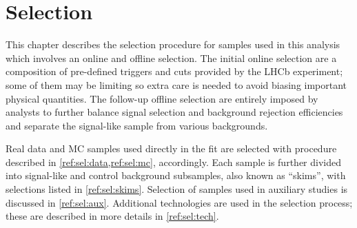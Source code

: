 \chapter{Selection}
\label{ref:sel}

This chapter describes the selection procedure for samples used in this
analysis which involves an online and offline selection.
The initial online selection are a composition of
pre-defined triggers and cuts provided by the LHCb experiment;
some of them may be limiting so extra care is needed to avoid biasing important
physical quantities.
The follow-up offline selection are entirely imposed by analysts
to further balance signal selection and background rejection efficiencies
and separate the signal-like sample from various backgrounds.

Real data and MC samples used directly in the fit are selected with procedure
described in \cref{ref:sel:data,ref:sel:mc}, accordingly.
Each sample is further divided into signal-like and control background
subsamples, also known as ``skims'', with selections listed in
\cref{ref:sel:skims}.
Selection of samples used in auxiliary studies is discussed in
\cref{ref:sel:aux}.
Additional technologies are used in the selection process;
these are described in more details in
\cref{ref:sel:tech}.









